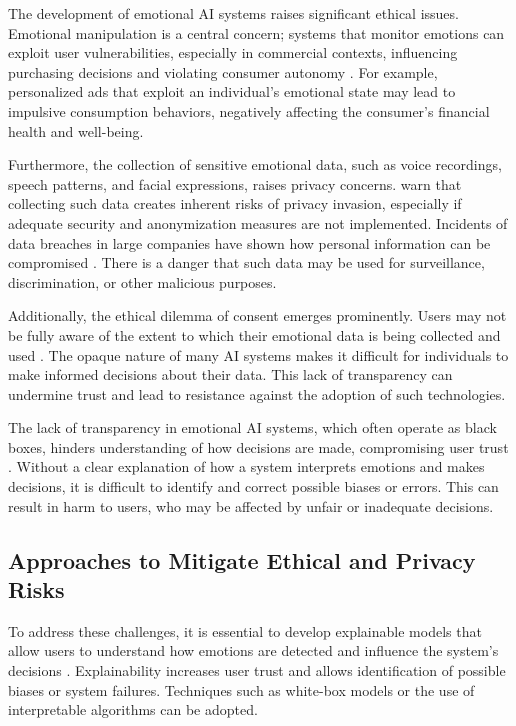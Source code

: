 \documentclass[a4paper,12pt]{report}
\begin{document}
	The development of emotional AI systems raises significant ethical issues. Emotional manipulation is a central concern; systems that monitor emotions can exploit user vulnerabilities, especially in commercial contexts, influencing purchasing decisions and violating consumer autonomy \parencite{pessoa2008}. For example, personalized ads that exploit an individual's emotional state may lead to impulsive consumption behaviors, negatively affecting the consumer's financial health and well-being.
	
	Furthermore, the collection of sensitive emotional data, such as voice recordings, speech patterns, and facial expressions, raises privacy concerns. \textcite{loewenstein2001} warn that collecting such data creates inherent risks of privacy invasion, especially if adequate security and anonymization measures are not implemented. Incidents of data breaches in large companies have shown how personal information can be compromised \parencite{solove2013}. There is a danger that such data may be used for surveillance, discrimination, or other malicious purposes.
	
	Additionally, the ethical dilemma of consent emerges prominently. Users may not be fully aware of the extent to which their emotional data is being collected and used \parencite{solove2013}. The opaque nature of many AI systems makes it difficult for individuals to make informed decisions about their data. This lack of transparency can undermine trust and lead to resistance against the adoption of such technologies.
	
	The lack of transparency in emotional AI systems, which often operate as black boxes, hinders understanding of how decisions are made, compromising user trust \parencite{russell2020}. Without a clear explanation of how a system interprets emotions and makes decisions, it is difficult to identify and correct possible biases or errors. This can result in harm to users, who may be affected by unfair or inadequate decisions.
	
	\subsection{Approaches to Mitigate Ethical and Privacy Risks}
	
	To address these challenges, it is essential to develop explainable models that allow users to understand how emotions are detected and influence the system's decisions \parencite{russell2020}. Explainability increases user trust and allows identification of possible biases or system failures. Techniques such as white-box models or the use of interpretable algorithms can be adopted.
	
\end{document}

